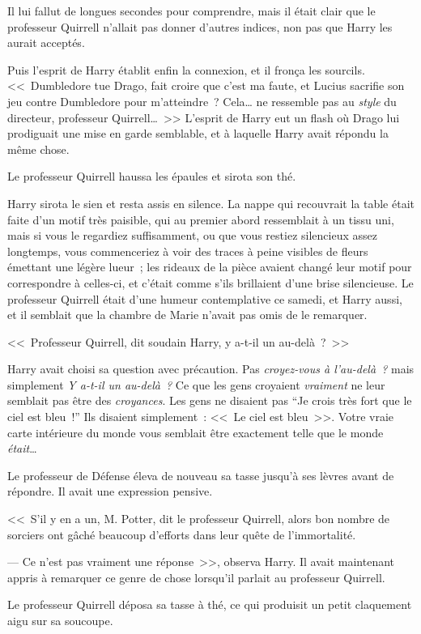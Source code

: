 Il lui fallut de longues secondes pour comprendre, mais il était clair que le professeur Quirrell n'allait pas donner d'autres indices, non pas que Harry les aurait acceptés.

Puis l'esprit de Harry établit enfin la connexion, et il fronça les sourcils. <<~Dumbledore tue Drago, fait croire que c'est ma faute, et Lucius sacrifie son jeu contre Dumbledore pour m'atteindre~? Cela… ne ressemble pas au \emph{style} du directeur, professeur Quirrell…~>> L'esprit de Harry eut un flash où Drago lui prodiguait une mise en garde semblable, et à laquelle Harry avait répondu la même chose.

Le professeur Quirrell haussa les épaules et sirota son thé.

Harry sirota le sien et resta assis en silence. La nappe qui recouvrait la table était faite d'un motif très paisible, qui au premier abord ressemblait à un tissu uni, mais si vous le regardiez suffisamment, ou que vous restiez silencieux assez longtemps, vous commenceriez à voir des traces à peine visibles de fleurs émettant une légère lueur~; les rideaux de la pièce avaient changé leur motif pour correspondre à celles-ci, et c'était comme s'ils brillaient d'une brise silencieuse. Le professeur Quirrell était d'une humeur contemplative ce samedi, et Harry aussi, et il semblait que la chambre de Marie n'avait pas omis de le remarquer.

<<~Professeur Quirrell, dit soudain Harry, y a-t-il un au-delà~?~>>

Harry avait choisi sa question avec précaution. Pas \emph{croyez-vous à l'au-delà~?} mais simplement \emph{Y a-t-il un au-delà~?} Ce que les gens croyaient \emph{vraiment} ne leur semblait pas être des \emph{croyances}. Les gens ne disaient pas “Je crois très fort que le ciel est bleu~!” Ils disaient simplement~: <<~Le ciel est bleu~>>. Votre vraie carte intérieure du monde vous semblait être exactement telle que le monde \emph{était}…

Le professeur de Défense éleva de nouveau sa tasse jusqu'à ses lèvres avant de répondre. Il avait une expression pensive.

<<~S'il y en a un, M. Potter, dit le professeur Quirrell, alors bon nombre de sorciers ont gâché beaucoup d'efforts dans leur quête de l'immortalité.

--- Ce n'est pas vraiment une réponse~>>, observa Harry. Il avait maintenant appris à remarquer ce genre de chose lorsqu'il parlait au professeur Quirrell.

Le professeur Quirrell déposa sa tasse à thé, ce qui produisit un petit claquement aigu sur sa soucoupe.

